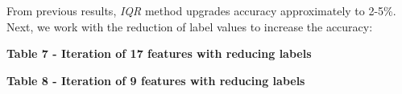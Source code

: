 From previous results, \emph{IQR} method upgrades accuracy approximately
to 2-5\%. Next, we work with the reduction of label values to increase
the accuracy:

{\bfseries Table 7 - Iteration of 17 features with reducing labels}


{\bfseries Table 8 - Iteration of 9 features with reducing labels}

